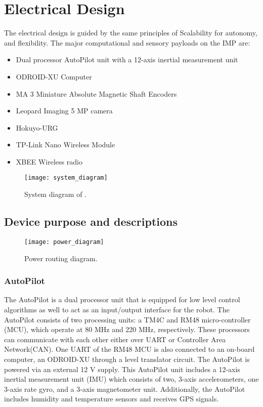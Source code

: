 \section{Electrical Design}

The electrical design is guided by the same principles of Scalability for autonomy, and flexibility. The major computational and sensory payloads on the IMP are:

\begin{itemize}
\item 	Dual processor AutoPilot unit with a 12-axis inertial measurement unit
\item  	ODROID-XU Computer
\item 	MA 3 Miniature Absolute Magnetic Shaft Encoders
\item  	Leopard Imaging 5 MP camera
\item  	Hokuyo-URG
\item	TP-Link Nano Wireless Module
\item  	XBEE Wireless radio
\end{itemize}
\begin{figure}
\centering
\texttt{[image: system\_diagram]}
\caption{System diagram of \imp.}
\label{fig:system_digram}
\end{figure}
\subsection{Device purpose and descriptions}
\begin{figure}
\centering
\texttt{[image: power\_diagram]}
\caption{\imp Power routing diagram.}
\label{fig:power_diagram}
\end{figure}

\subsubsection{AutoPilot}

The AutoPilot is a dual processor unit that is equipped for low level control algorithms as well to act as an input/output interface for the robot. The AutoPilot consists of two processing units: a TM4C and RM48 micro-controller (MCU), which operate at 80 MHz and 220 MHz, respectively. These processors can communicate with each other either over UART or Controller Area Network(CAN). One UART of the RM48 MCU is also connected to an on-board computer, an ODROID-XU through a level translator circuit. The AutoPilot is powered via an external 12 V supply. This AutoPilot unit includes a 12-axis inertial measurement unit (IMU) which consists of two, 3-axis accelerometers, one 3-axis rate gyro, and a 3-axis magnetometer unit. Additionally, the AutoPilot includes humidity and temperature sensors and receives GPS signals. 

